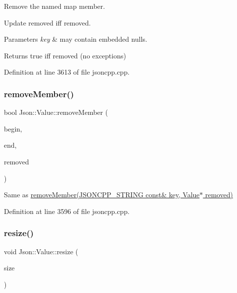 Remove the named map member. 

Update \textquotesingle{}removed\textquotesingle{} iff removed. 
\begin{DoxyParams}{Parameters}
{\em key} & may contain embedded nulls. \\
\hline
\end{DoxyParams}
\begin{DoxyReturn}{Returns}
true iff removed (no exceptions) 
\end{DoxyReturn}


Definition at line 3613 of file jsoncpp.\+cpp.

\hypertarget{class_json_1_1_value_a49c91af727d6b4eb0af02a81bb2def87}{}\label{class_json_1_1_value_a49c91af727d6b4eb0af02a81bb2def87} 
\subsubsection{\texorpdfstring{remove\+Member()}{removeMember()}\hspace{0.1cm}{\footnotesize\ttfamily [10/10]}}
{\footnotesize\ttfamily bool Json\+::\+Value\+::remove\+Member (\begin{DoxyParamCaption}\item[{const char $\ast$}]{begin,  }\item[{const char $\ast$}]{end,  }\item[{\hyperlink{class_json_1_1_value}{Value} $\ast$}]{removed }\end{DoxyParamCaption})}



Same as \hyperlink{class_json_1_1_value_ae385ecef98427970df525ee876e9f54a}{remove\+Member(\+J\+S\+O\+N\+C\+P\+P\+\_\+\+S\+T\+R\+I\+N\+G const\& key, Value$\ast$ removed)} 



Definition at line 3596 of file jsoncpp.\+cpp.

\hypertarget{class_json_1_1_value_aa284353271ada427dbfa04a42f2be407}{}\label{class_json_1_1_value_aa284353271ada427dbfa04a42f2be407} 
\subsubsection{\texorpdfstring{resize()}{resize()}\hspace{0.1cm}{\footnotesize\ttfamily [1/2]}}
{\footnotesize\ttfamily void Json\+::\+Value\+::resize (\begin{DoxyParamCaption}\item[{\hyperlink{class_json_1_1_value_a184a91566cccca7b819240f0d5561c7d}{Array\+Index}}]{size }\end{DoxyParamCaption})}

